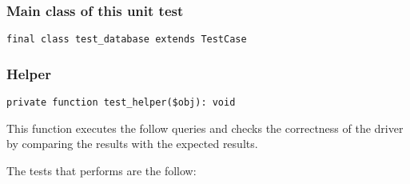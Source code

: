\documentclass[a4paper]{article}
\begin{document}
\hypertarget{toc45}{}
\subsubsection{Main class of this unit test}

\begin{lstlisting}
final class test_database extends TestCase
\end{lstlisting}

\hypertarget{toc46}{}
\subsubsection{Helper}

\begin{lstlisting}
private function test_helper($obj): void
\end{lstlisting}

This function executes the follow queries and checks the correctness
of the driver by comparing the results with the expected results.

The tests that performs are the follow:
\end{document}
